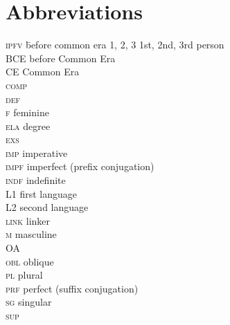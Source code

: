 \documentclass[output=paper]{langsci/langscibook}
\begin{document}
\section*{Abbreviations}
\setlength{\columnsep}{30pt}
\begin{multicols}{2}
\begin{tabbing}
\textsc{ipfv} \hspace{1em} \= before common era\kill
\textsc{1, 2, 3} \> 1st, 2nd, 3rd person \\
BCE \> before Common Era \\
CE \> Common Era \\
\textsc{comp} \>  \\
\textsc{def} \>  \\
\textsc{f} \> feminine \\
\textsc{ela} \>  degree \\
\textsc{exs} \>  \\
\textsc{imp} \> imperative \\
\textsc{impf} \> imperfect (prefix conjugation) \\
\textsc{indf} \> indefinite \\
L1 \> first language \\
L2 \> second language \\
\textsc{link} \> linker \\
\textsc{m} \> masculine \\
OA \>   \\
\textsc{obl} \> oblique \\
\textsc{pl} \> plural \\
\textsc{prf} \> perfect (suffix conjugation) \\
\textsc{sg} \> singular \\
\textsc{sup} \> 
\end{tabbing}
\end{multicols}


\sloppy
\printbibliography[heading=subbibliography,notkeyword=this] 
\end{document}
